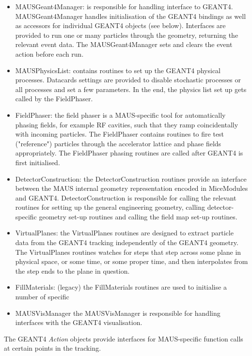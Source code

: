 \begin{itemize}
\item MAUSGeant4Manager: is responsible for handling interface to GEANT4. MAUSGeant4Manager handles initialisation of the GEANT4 bindings as well as accessors for individual GEANT4 objects (see below). Interfaces are provided to run one or many particles through the geometry, returning the relevant event data. The MAUSGeant4Manager sets and clears the event action before each run.
\item MAUSPhysicsList: contains routines to set up the GEANT4 physical processes. Datacards settings are provided to disable stochastic processes or all processes and set a few parameters. In the end, the physics list set up gets called by the FieldPhaser.
\item FieldPhaser: the field phaser is a MAUS-specific tool for automatically phasing fields, for example RF cavities, such that they ramp coincidentally with incoming particles. The FieldPhaser contains routines to fire test ("reference") particles through the accelerator lattice and phase fields appropriately. The FieldPhaser phasing routines are called after GEANT4 is first initialised.
\item DetectorConstruction: the DetectorConstruction routines provide an interface between the MAUS internal geometry representation encoded in MiceModules and GEANT4. DetectorConstruction is responsible for calling the relevant routines for setting up the general engineering geometry, calling detector-specific geometry set-up routines and calling the field map set-up routines.
\item VirtualPlanes: the VirtualPlanes routines are designed to extract particle data from the GEANT4 tracking independently of the GEANT4 geometry. The VirtualPlanes routines watches for steps that step across some plane in physical space, or some time, or some proper time, and then interpolates from the step ends to the plane in question.
\item FillMaterials: (legacy) the FillMaterials routines are used to initialise a number of specific 
\item MAUSVisManager the MAUSVisManager is responsible for handling interfaces with the GEANT4 visualisation.
\end{itemize}

The GEANT4 \emph{Action} objects provide interfaces for MAUS-specific function calls at certain points in the tracking.


